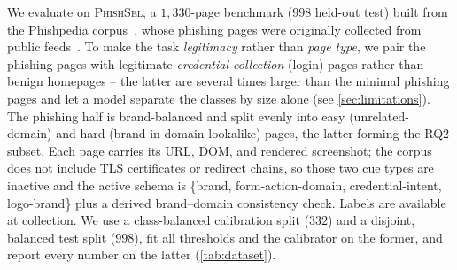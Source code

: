 We evaluate on \textsc{PhishSel}, a $1{,}330$-page benchmark ($998$ held-out test) built
from the Phishpedia corpus~\cite{lin2021phishpedia}, whose phishing pages were originally
collected from public feeds~\cite{openphish,phishtank}. To make the task
\emph{legitimacy} rather than \emph{page type}, we pair the phishing pages with legitimate
\emph{credential-collection} (login) pages rather than benign homepages -- the latter are
several times larger than the minimal phishing pages and let a model separate the classes
by size alone (see \autoref{sec:limitations}). The phishing half is brand-balanced and
split evenly into easy (unrelated-domain) and hard (brand-in-domain lookalike) pages, the
latter forming the RQ2 subset. Each page carries its URL, DOM, and rendered screenshot;
the corpus does not include TLS certificates or redirect chains, so those two cue types are
inactive and the active schema is \{brand, form-action-domain, credential-intent,
logo-brand\} plus a derived brand--domain consistency check. Labels are available at
collection. We use a class-balanced calibration split ($332$) and a disjoint, balanced test
split ($998$), fit all thresholds and the calibrator on the former, and report every number
on the latter (\autoref{tab:dataset}).



